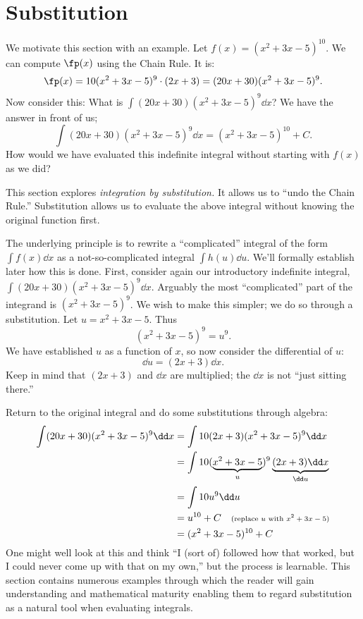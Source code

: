 \section{Substitution}\label{sec:substitution}

We motivate this section with an example. Let $f(x) = (x^2+3x-5)^{10}$. We can compute $\fp(x)$ using the Chain Rule. It is:
\[\fp(x) = 10(x^2+3x-5)^9\cdot(2x+3) = (20x+30)(x^2+3x-5)^9.\]
Now consider this: What is $\int (20x+30)(x^2+3x-5)^9\dd x$? We have the answer in front of us;
\[\int (20x+30)(x^2+3x-5)^9\dd x = (x^2+3x-5)^{10}+C.\]
How would we have evaluated this indefinite integral without starting with $f(x)$ as we did?

This section explores \emph{integration by substitution.} It allows us to ``undo the Chain Rule.'' Substitution allows us to evaluate the above integral without knowing the original function first.

The underlying principle is to rewrite a ``complicated'' integral of the form $\int f(x)\dd x$ as a not-so-complicated integral $\int h(u)\dd u$. We'll formally establish later how this is done. First, consider again our introductory indefinite integral, $\int (20x+30)(x^2+3x-5)^9\dd x$. Arguably the most ``complicated'' part of the integrand is $(x^2+3x-5)^9$. We wish to make this simpler; we do so through a substitution. Let $u=x^2+3x-5$. Thus
\[(x^2+3x-5)^9 = u^9.\]
We have established $u$ as a function of $x$, so now consider the differential of $u$:
\[\dd u = (2x+3)\dd x.\]
Keep in mind that $(2x+3)$ and $\dd x$ are multiplied; the $\dd x$ is not ``just sitting there.''

Return to the original integral and do some substitutions through algebra:
\begin{align*}
	\int (20x+30)(x^2+3x-5)^9\dd x
	&=	\int 10(2x+3)(x^2+3x-5)^9\dd x \\
	&=\int 10(\underbrace{x^2+3x-5}_u)^9\underbrace{(2x+3)\dd x}_{\dd u} \\
	&=\int 10u^9\dd u \\
	&= u^{10} + C \quad \text{\scriptsize (replace $u$ with $x^2+3x-5$)}\\
	&= (x^2+3x-5)^{10} +C
\end{align*}
One might well look at this and think ``I (sort of) followed how that worked, but I could never come up with that on my own,'' but the process is learnable. This section contains numerous examples through which the reader will gain understanding and mathematical maturity enabling them to regard substitution as a natural tool when evaluating integrals.

